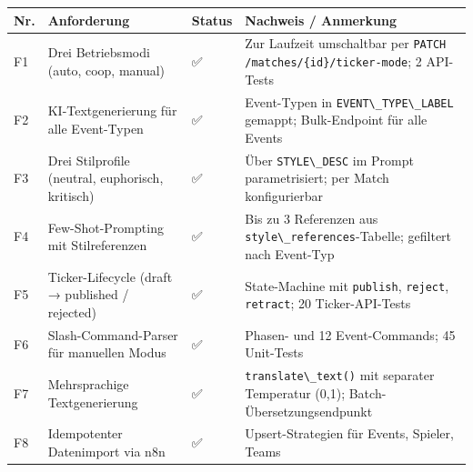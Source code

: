 {\def\LTcaptype{none} %
\begin{longtable}[]{@{}
  >{\raggedright\arraybackslash}p{}
  >{\raggedright\arraybackslash}p{}
  >{\raggedright\arraybackslash}p{}
  >{\raggedright\arraybackslash}p{}@{}}
\toprule\noalign{}
\begin{minipage}[b]{\linewidth}\raggedright
Nr.
\end{minipage} & \begin{minipage}[b]{\linewidth}\raggedright
Anforderung
\end{minipage} & \begin{minipage}[b]{\linewidth}\raggedright
Status
\end{minipage} & \begin{minipage}[b]{\linewidth}\raggedright
Nachweis / Anmerkung
\end{minipage} \\
\midrule\noalign{}
\endhead
\bottomrule\noalign{}
\endlastfoot
F1 & Drei Betriebsmodi (auto, coop, manual) & ✅ & Zur Laufzeit
umschaltbar per
\passthrough{\lstinline!PATCH /matches/\{id\}/ticker-mode!}; 2
API-Tests \\
F2 & KI-Textgenerierung für alle Event-Typen & ✅ & 24 Event-Typen in
\passthrough{\lstinline!EVENT\_TYPE\_LABEL!} gemappt; Bulk-Endpoint für
alle Events \\
F3 & Drei Stilprofile (neutral, euphorisch, kritisch) & ✅ & Über
\passthrough{\lstinline!STYLE\_DESC!} im Prompt parametrisiert; per
Match konfigurierbar \\
F4 & Few-Shot-Prompting mit Stilreferenzen & ✅ & Bis zu 3 Referenzen
aus \passthrough{\lstinline!style\_references!}-Tabelle; gefiltert nach
Event-Typ \\
F5 & Ticker-Lifecycle (draft → published / rejected) & ✅ &
State-Machine mit \passthrough{\lstinline!publish!},
\passthrough{\lstinline!reject!}, \passthrough{\lstinline!retract!}; 20
Ticker-API-Tests \\
F6 & Slash-Command-Parser für manuellen Modus & ✅ & 11 Phasen- und 12
Event-Commands; 45 Unit-Tests \\
F7 & Mehrsprachige Textgenerierung & ✅ &
\passthrough{\lstinline!translate\_text()!} mit separater Temperatur
(0,1); Batch-Übersetzungsendpunkt \\
F8 & Idempotenter Datenimport via n8n & ✅ & Upsert-Strategien für
Events, Spieler, Teams \\

\end{longtable}}
